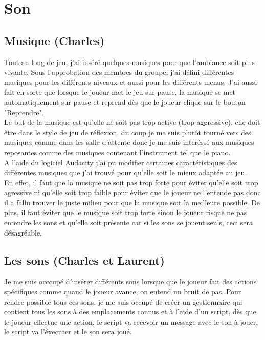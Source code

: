 \documentclass[a4paper , 12pt]{article}
\begin{document}
\newpage

\section{Son}

	\subsection {Musique (Charles)}

	\quad

Tout au long de jeu, j'ai inséré quelques musiques pour que l'ambiance soit plus vivante. Sous l'approbation des membres du groupe, j'ai défini différentes musiques pour les différents niveaux et aussi pour les différents menus. J'ai aussi fait en sorte que lorsque le joueur met le jeu sur pause, la musique se met automatiquement sur pause et reprend dès que le joueur clique sur le bouton "Reprendre".\\

Le but de la musique est qu'elle ne soit pas trop active (trop aggressive), elle doit être dans le style de jeu de réflexion, du coup je me suis plutôt tourné vers des musiques comme dans les salle d'attente donc je me suis interéssé aux musiques reposantes comme des musiques contenant l'instrument tel que le piano.\\

A l'aide du logiciel Audacity j'ai pu modifier certaines caractéristiques des différentes musiques que j'ai trouvé pour qu'elle soit le mieux adaptée au jeu. \\

En effet, il faut que la musique ne soit pas trop forte pour éviter qu’elle soit trop agressive ni qu’elle soit trop faible pour éviter que le joueur ne l’entende pas donc il a fallu trouver le juste milieu pour que la musique soit la meilleure possible.
De plus, il faut éviter que le musique soit trop forte sinon le joueur risque ne pas entendre les sons et qu’elle soit présente car si les sons se jouent seuls, ceci sera désagréable.

	\quad

\newpage

	\subsection{Les sons (Charles et Laurent)}

	\quad


 Je me suis occcupé d'insérer différents sons lorsque que le joueur fait des actions spécifiques comme quand le joueur avance, on entend un bruit de pas. Pour rendre possible tous ces sons, je me suis occupé de créer un gestionnaire qui contient tous les sons à des emplacements connus et à l'aide d'un script, dès que le joueur effectue une action, le script va recevoir un message avec le son à jouer, le script va l'éxecuter et le son sera joué.\\
\end{document}
